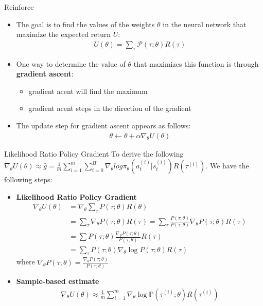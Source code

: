 \documentclass[10pt,mathserif]{beamer}
\begin{document}


\begin{frame}{Reinforce}
\begin{itemize}
\item The goal is to find the values of the weights $\theta$ in the neural network that maximize the expected return $U$:
\begin{align}
U(\theta) = \sum_{\tau}\mathcal{P}(\tau;\theta)R(\tau)
\end{align}
\item One way to determine the value of $\theta$ that maximizes this function is through \textbf{gradient ascent}:
\begin{itemize}
\item gradient acent will find the maximum
\item gradient acent steps in the direction of the gradient
\end{itemize}
\item The update step for gradient ascent appears as follows:
\begin{align}
\theta \leftarrow \theta  + \alpha \nabla_\theta U(\theta)
\end{align}
\end{itemize}
\end{frame}

\begin{frame}{Likelihood Ratio Policy Gradient}
To derive the following $\nabla_\theta U(\theta) \approx \hat{g}=\frac{1}{m}\sum_{i=1}^m\sum_{t=0}^H\nabla_\theta
log\pi_\theta(a_t^{(i)}|s_t^{(i)})R(\tau^{(i)})$. We have the following steps:
\begin{itemize}
\item \textbf{Likelihood Ratio Policy Gradient}
\begin{align}
\nabla_\theta U(\theta) &= \nabla_\theta \sum_{\tau} P(\tau;\theta)R(\theta) \\ \nonumber
& = \sum_{\tau} \nabla_\theta P(\tau;\theta)R(\tau) = \sum_{\tau} \frac{P(\tau;\theta)}{P(\tau;\theta)}\nabla_\theta P(\tau;\theta)R(\tau) \\ \nonumber
& = \sum P(\tau;\theta) \frac{\nabla_\theta P(\tau;\theta)}{ P(\tau;\theta)} R(\tau) \\ \nonumber
& = \sum_\tau  P(\tau;\theta)\nabla_\theta \log  P(\tau;\theta)R(\tau)
\end{align}
where $\nabla_\theta P(\tau;\theta) =\frac{\nabla_\theta P(\tau;\theta)}{ P(\tau;\theta)}$
\item \textbf{Sample-based estimate}
\begin{align}
\nabla_\theta U(\theta) \approx \frac{1}{m}\sum_{i=1}^m \nabla_\theta\log \mathbb{P}(\tau^{(i)};\theta)R(\tau^{(i)})
\end{align}
\end{itemize}
\end{frame}
\end{document}
